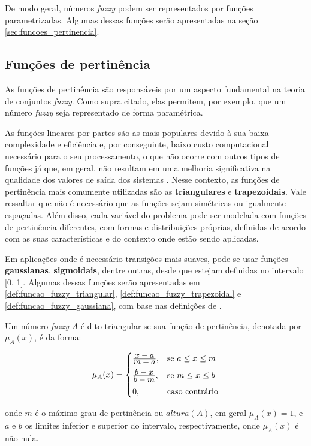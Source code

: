 De modo geral, números \emph{fuzzy} podem ser representados por funções parametrizadas. Algumas dessas funções serão apresentadas na seção \ref{sec:funcoes_pertinencia}.

\subsection{Funções de pertinência}
\label{sec:funcoes_pertinencia}
As funções de pertinência são responsáveis por um aspecto fundamental na teoria de conjuntos \emph{fuzzy}. Como supra citado, elas permitem, por exemplo, que um número \emph{fuzzy} seja representado de forma paramétrica.

As funções lineares por partes são as mais populares devido à sua baixa complexidade e eficiência e, por conseguinte, baixo custo computacional necessário para o seu processamento, o que não ocorre com outros tipos de funções já que, em geral, não resultam em uma melhoria significativa na qualidade dos valores de saída dos sistemas \citep{yen:99}. Nesse contexto, as funções de pertinência mais comumente utilizadas são as \textbf{triangulares} e \textbf{trapezoidais}. Vale ressaltar que não é necessário que as funções sejam simétricas ou igualmente  espaçadas. Além disso, cada variável do problema pode ser modelada com funções de pertinência diferentes,  com  formas  e  distribuições  próprias, definidas  de  acordo com  as suas características e do contexto onde estão sendo aplicadas.

Em aplicações onde é necessário transições mais suaves, pode-se usar funções \textbf{gaussianas}, \textbf{sigmoidais}, dentre outras, desde que estejam definidas no intervalo [0, 1]. Algumas dessas funções serão apresentadas em \ref{def:funcao_fuzzy_triangular}, \ref{def:funcao_fuzzy_trapezoidal} e \ref{def:funcao_fuzzy_gaussiana}, com base nas definições de \citet{sumathi:10}.

\begin{defn}
\label{def:funcao_fuzzy_triangular}
Um número \emph{fuzzy} $A$ é dito triangular se sua função de pertinência, denotada por $\mu_{A}(x)$, é da forma:

\begin{equation}
  \mu_A(x) =  \begin{cases}
                \frac{\displaystyle x - a}{\displaystyle m - a}, & \text{se}\ a \leq x \leq m\\[0.5em]
                \frac{\displaystyle b - x}{\displaystyle b - m}, & \text{se}\ m \leq x \leq b\\[0.5em]
                0, & \text{caso contrário}
              \end{cases}
\end{equation}
\end{defn}
\noindent onde $m$ é o máximo grau de pertinência ou $altura(A)$, em geral $\mu_A(x) = 1$, e $a$ e $b$ os limites inferior e superior do intervalo, respectivamente, onde $\mu_A(x)$ é não nula.

